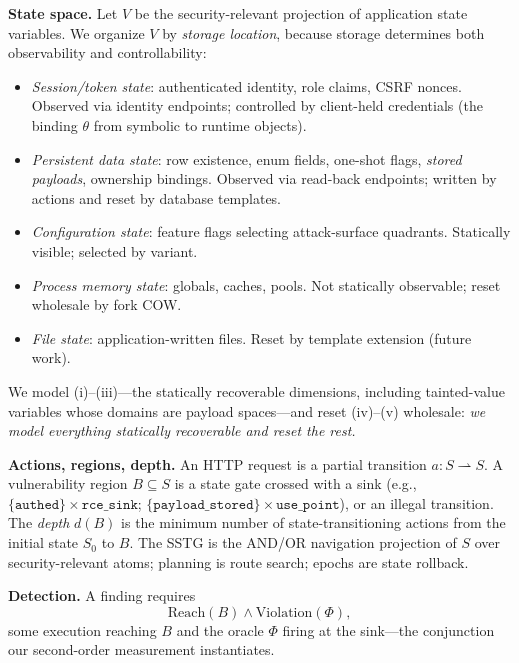 \documentclass[letterpaper,twocolumn,10pt]{article}
\begin{document}
\textbf{State space.} Let $V$ be the security-relevant projection of application state variables. We organize $V$ by \emph{storage location}, because storage determines both observability and controllability:

\begin{itemize}
\item[(i)] \emph{Session/token state}: authenticated identity, role claims, CSRF nonces. Observed via identity endpoints; controlled by client-held credentials (the binding $\theta$ from symbolic to runtime objects).
\item[(ii)] \emph{Persistent data state}: row existence, enum fields, one-shot flags, \emph{stored payloads}, ownership bindings. Observed via read-back endpoints; written by actions and reset by database templates.
\item[(iii)] \emph{Configuration state}: feature flags selecting attack-surface quadrants. Statically visible; selected by variant.
\item[(iv)] \emph{Process memory state}: globals, caches, pools. Not statically observable; reset wholesale by fork COW.
\item[(v)] \emph{File state}: application-written files. Reset by template extension (future work).
\end{itemize}

We model (i)--(iii)---the statically recoverable dimensions, including tainted-value variables whose domains are payload spaces---and reset (iv)--(v) wholesale: \emph{we model everything statically recoverable and reset the rest.}

\textbf{Actions, regions, depth.} An HTTP request is a partial transition $a: S \rightharpoonup S$. A vulnerability region $B \subseteq S$ is a state gate crossed with a sink (e.g., $\{\texttt{authed}\}\times\texttt{rce\_sink}$; $\{\texttt{payload\_stored}\}\times\texttt{use\_point}$), or an illegal transition. The \emph{depth} $d(B)$ is the minimum number of state-transitioning actions from the initial state $S_0$ to $B$. The SSTG is the AND/OR navigation projection of $S$ over security-relevant atoms; planning is route search; epochs are state rollback.

\textbf{Detection.} A finding requires
\begin{equation}
\mathrm{Reach}(B) \wedge \mathrm{Violation}(\Phi),
\end{equation}
some execution reaching $B$ and the oracle $\Phi$ firing at the sink---the conjunction our second-order measurement instantiates.
\end{document}
